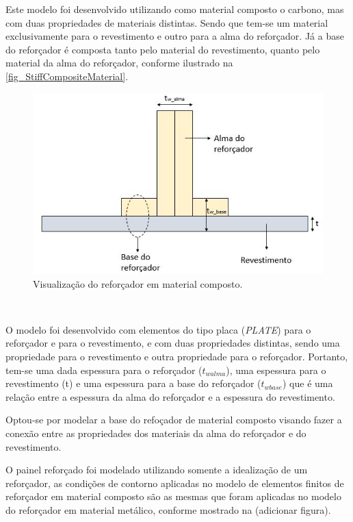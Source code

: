{Este modelo foi desenvolvido utilizando como material composto o carbono, mas com duas propriedades de materiais distintas. Sendo que tem-se um material exclusivamente para o revestimento e outro para a alma do reforçador. Já a base do reforçador é composta tanto pelo material do revestimento, quanto pelo material da alma do reforçador, conforme ilustrado na \autoref{fig_StiffCompositeMaterial}.

\begin{figure}[ht]
 \caption{\label{fig_StiffCompositeMaterial}Visualização do reforçador em material composto.}
 \centering
 \includegraphics[scale=0.7]{figura/StiffCompositeMaterial}
\end{figure}
\

O modelo foi desenvolvido com elementos do tipo placa (\emph{PLATE}) para o reforçador e para o revestimento, e com duas propriedades distintas, sendo uma propriedade para o revestimento e outra propriedade para o reforçador. Portanto, tem-se uma dada espessura para o reforçador ($t_{w alma}$), uma espessura para o revestimento (t) e uma espessura para a base do reforçador ($t_{w base}$) que é uma relação entre a espessura da alma do reforçador e a espessura do revestimento.

Optou-se por modelar a base do refoçador de material composto visando fazer a conexão entre as propriedades dos materiais da alma do reforçador e do revestimento.

O painel reforçado foi modelado utilizando somente a idealização de um reforçador, as condições de contorno aplicadas no modelo de elementos finitos de reforçador em material composto são as mesmas que foram aplicadas no modelo do reforçador em material metálico, conforme mostrado na (adicionar figura). %

}
